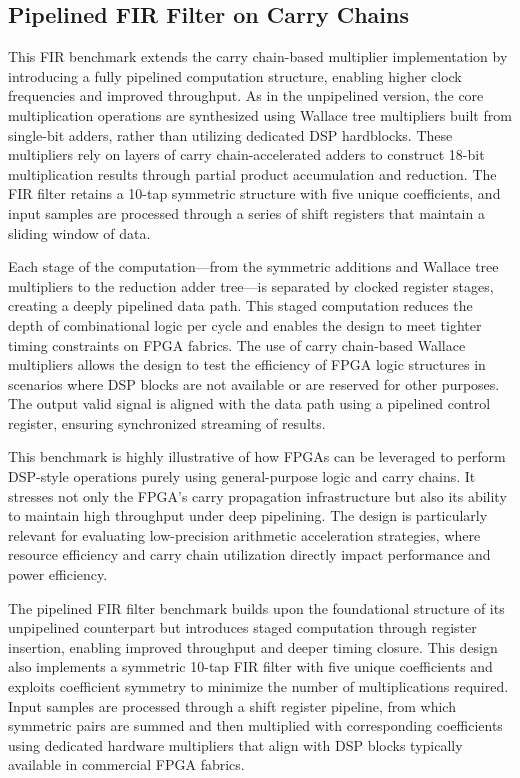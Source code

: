 \subsection{Pipelined FIR Filter on Carry Chains}
This FIR benchmark extends the carry chain-based multiplier implementation by introducing a fully pipelined computation structure, enabling higher clock frequencies and improved throughput. As in the unpipelined version, the core multiplication operations are synthesized using Wallace tree multipliers built from single-bit adders, rather than utilizing dedicated DSP hardblocks. These multipliers rely on layers of carry chain-accelerated adders to construct 18-bit multiplication results through partial product accumulation and reduction. The FIR filter retains a 10-tap symmetric structure with five unique coefficients, and input samples are processed through a series of shift registers that maintain a sliding window of data.

Each stage of the computation—from the symmetric additions and Wallace tree multipliers to the reduction adder tree—is separated by clocked register stages, creating a deeply pipelined data path. This staged computation reduces the depth of combinational logic per cycle and enables the design to meet tighter timing constraints on FPGA fabrics. The use of carry chain-based Wallace multipliers allows the design to test the efficiency of FPGA logic structures in scenarios where DSP blocks are not available or are reserved for other purposes. The output valid signal is aligned with the data path using a pipelined control register, ensuring synchronized streaming of results.

This benchmark is highly illustrative of how FPGAs can be leveraged to perform DSP-style operations purely using general-purpose logic and carry chains. It stresses not only the FPGA's carry propagation infrastructure but also its ability to maintain high throughput under deep pipelining. The design is particularly relevant for evaluating low-precision arithmetic acceleration strategies, where resource efficiency and carry chain utilization directly impact performance and power efficiency.

The pipelined FIR filter benchmark builds upon the foundational structure of its unpipelined counterpart but introduces staged computation through register insertion, enabling improved throughput and deeper timing closure. This design also implements a symmetric 10-tap FIR filter with five unique coefficients and exploits coefficient symmetry to minimize the number of multiplications required. Input samples are processed through a shift register pipeline, from which symmetric pairs are summed and then multiplied with corresponding coefficients using dedicated hardware multipliers that align with DSP blocks typically available in commercial FPGA fabrics.

